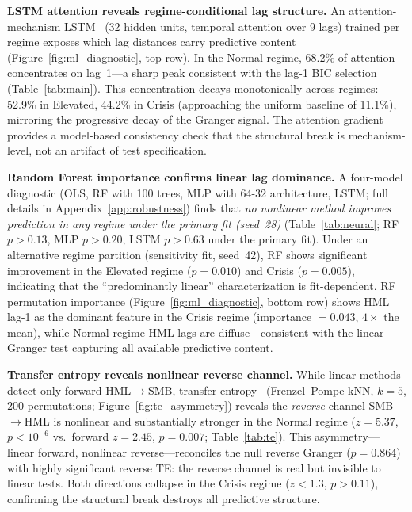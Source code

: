 \documentclass[sigconf,anonymous]{acmart}
\begin{document}
\textbf{LSTM attention reveals regime-conditional lag structure.}
An attention-mechanism LSTM~\cite{tank2022neural} (32 hidden units,
temporal attention over 9 lags) trained per regime exposes which lag
distances carry predictive content (Figure~\ref{fig:ml_diagnostic},
top row). In the Normal regime, 68.2\% of attention concentrates on
lag~1---a sharp peak consistent with the lag-1 BIC selection
(Table~\ref{tab:main}). This concentration decays monotonically across
regimes: 52.9\% in Elevated, 44.2\% in Crisis (approaching the uniform
baseline of 11.1\%), mirroring the progressive decay of the Granger
signal. The attention gradient provides a model-based consistency check that
the structural break is mechanism-level, not an artifact of test specification.

\textbf{Random Forest importance confirms linear lag dominance.}
A four-model diagnostic (OLS, RF with 100 trees, MLP with 64-32 architecture,
LSTM; full details in Appendix~\ref{app:robustness}) finds that
\emph{no nonlinear method improves prediction in any regime under the primary fit (seed~28)}
(Table~\ref{tab:neural}; RF $p > 0.13$, MLP $p > 0.20$, LSTM $p > 0.63$
under the primary fit). Under an alternative regime partition (sensitivity fit, seed~42), RF shows significant improvement in the Elevated regime ($p = 0.010$) and Crisis ($p = 0.005$), indicating that the ``predominantly linear'' characterization is fit-dependent.
RF permutation importance
(Figure~\ref{fig:ml_diagnostic}, bottom row) shows HML lag-1 as the
dominant feature in the Crisis regime (importance $= 0.043$,
$4\times$ the mean), while Normal-regime HML lags are diffuse---consistent
with the linear Granger test capturing all available predictive content.

\textbf{Transfer entropy reveals nonlinear reverse channel.}
While linear methods detect only forward HML$\to$SMB, transfer
entropy~\cite{schreiber2000measuring,barnett2009granger} (Frenzel--Pompe
kNN, $k = 5$, 200 permutations; Figure~\ref{fig:te_asymmetry})
reveals the \emph{reverse} channel SMB$\to$HML is nonlinear and
substantially stronger in the Normal regime ($z = 5.37$, $p < 10^{-6}$
vs.\ forward $z = 2.45$, $p = 0.007$; Table~\ref{tab:te}).
This asymmetry---linear forward, nonlinear reverse---reconciles the null
reverse Granger ($p = 0.864$) with highly significant reverse TE:
the reverse channel is real but invisible to linear tests.
Both directions collapse in the Crisis regime ($z < 1.3$, $p > 0.11$),
confirming the structural break destroys all predictive structure.
\end{document}

